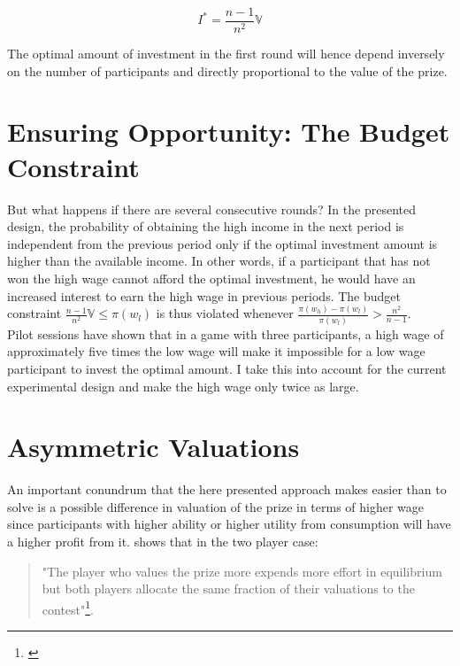 \begin{equation}
    I^{*} = \frac{n-1}{n^2}\mathbb{V}
\label{eq:opt_last}
\end{equation}

\hfill \break 

The optimal amount of investment in the first round will hence depend inversely on the number of participants and directly proportional to the value of the prize.\\

\section{Ensuring Opportunity: The Budget Constraint}
\label{sec:budget_constraint}

But what happens if there are several consecutive rounds? In the presented design, the probability of obtaining the high income in the next period is independent from the previous period only if the optimal investment amount is higher than the available income. In other words, if a participant that has not won the high wage cannot afford the optimal investment, he would have an increased interest to earn the high wage in previous periods. The budget constraint $\frac{n-1}{n^2}\mathbb{V} \leq \pi(w_l)$ is thus violated whenever $\frac{\pi(w_h)-\pi(w_l)}{\pi(w_l)} > \frac{n^2}{n-1}$.\\

Pilot sessions have shown that in a game with three participants, a high wage of approximately five times the low wage will make it impossible for a low wage participant to invest the optimal amount. I take this into account for the current experimental design and make the high wage only twice as large.

\section{Asymmetric Valuations}

An important conundrum that the here presented approach makes easier than \cite{koch2017} to solve is a possible difference in valuation of the prize in terms of higher wage since participants with higher ability or higher utility from consumption will have a higher profit from it. \cite{nti1999} shows that in the two player case:\\

\begin{quote}
    "The player who values the prize more expends more effort in equilibrium but both players allocate the same fraction of their valuations to the contest"\footnote{\cite[p.~419]{nti1999}}.
\end{quote}

